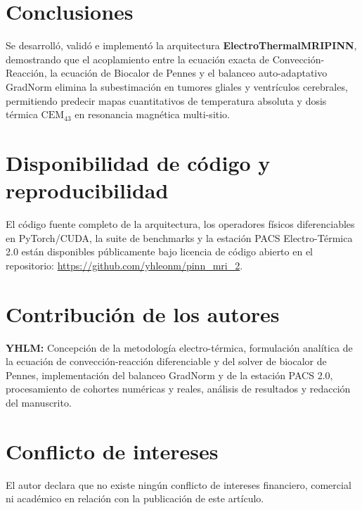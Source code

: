\documentclass[9pt]{article}
\begin{document}
\section{Conclusiones}
\label{sec:conclusiones}

Se desarrolló, validó e implementó la arquitectura \textbf{ElectroThermalMRIPINN}, demostrando que el acoplamiento entre la ecuación exacta de Convección-Reacción, la ecuación de Biocalor de Pennes y el balanceo auto-adaptativo GradNorm elimina la subestimación en tumores gliales y ventrículos cerebrales, permitiendo predecir mapas cuantitativos de temperatura absoluta y dosis térmica $\text{CEM}_{43}$ en resonancia magnética multi-sitio.

\section*{Disponibilidad de código y reproducibilidad}
El código fuente completo de la arquitectura, los operadores físicos diferenciables en PyTorch/CUDA, la suite de benchmarks y la estación PACS Electro-Térmica 2.0 están disponibles públicamente bajo licencia de código abierto en el repositorio: \url{https://github.com/yhleonm/pinn_mri_2}.

\section*{Contribución de los autores}
\textbf{YHLM:} Concepción de la metodología electro-térmica, formulación analítica de la ecuación de convección-reacción diferenciable y del solver de biocalor de Pennes, implementación del balanceo GradNorm y de la estación PACS 2.0, procesamiento de cohortes numéricas y reales, análisis de resultados y redacción del manuscrito.

\section*{Conflicto de intereses}
El autor declara que no existe ningún conflicto de intereses financiero, comercial ni académico en relación con la publicación de este artículo.
\end{document}
